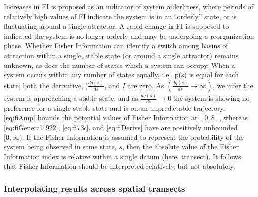 \documentclass[12pt,twoside,openany]{reedthesis}
\begin{document}
Increases in FI is proposed as an indicator of system orderliness, where periods of relatively high values of FI indicate the system is in an ``orderly'' state, or is fluctuating around a single attractor. A rapid change in FI is supposed to indicated the system is no longer orderly and may be undergoing a reorganization phase. Whether Fisher Information can identify a switch among basins of attraction within a single, stable state (or around a single attractor) remains unknown, as does the number of states which a system can occupy. When a system occurs within any number of states equally, i.e., p(s) is equal for each state, both the derivative, (\(\frac{dq(s)}{ds}\), and \(I\) are zero. As \((\frac{dq(s)}{ds} \rightarrow \infty)\), we infer the system is approaching a stable state, and as \(\frac{dq(s)}{ds} \rightarrow 0\) the system is showing no preference for a single stable state and is on an unpredictable trajectory. \eqref{eq:fiAmp} bounds the potential values of Fisher Information at \([0, 8]\), whereas \eqref{eq:fiGeneral1922}, \eqref{eq:fi73c}, and \eqref{eq:fiDerivs} have are positively unbounded \([0, \infty)\). If the Fisher Information is assumed to represent the probability of the system being observed in some state, \(s\), then the absolute value of the Fisher Information index is relative within a single datum (here, transect). It follows that Fisher Information should be interpreted relatively, but not absolutely.

\hypertarget{interpolating-results-across-spatial-transects}{%
\subsubsection{Interpolating results across spatial transects}\label{interpolating-results-across-spatial-transects}}
\end{document}
